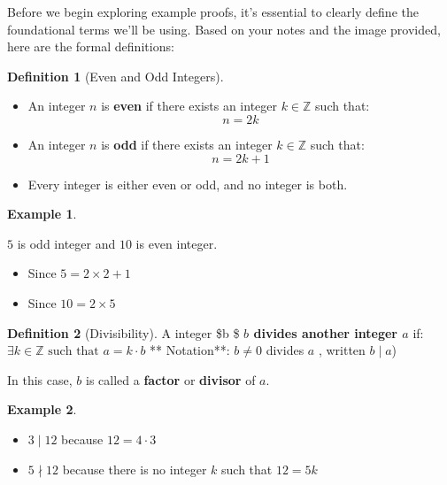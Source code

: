 \documentclass[
]{book}
\providecommand{\tightlist}{%
  \setlength{\itemsep}{0pt}\setlength{\parskip}{0pt}}
\theoremstyle{definition}
\newtheorem{definition}{Definition}[chapter]
\theoremstyle{definition}
\newtheorem{example}{Example}[chapter]
\theoremstyle{definition}
\theoremstyle{definition}
\theoremstyle{remark}
\begin{document}
Before we begin exploring example proofs, it's essential to clearly define the foundational terms we'll be using. Based on your notes and the image provided, here are the formal definitions:

\begin{definition}[Even and Odd Integers]
\protect\hypertarget{def:unnamed-chunk-63}{}\label{def:unnamed-chunk-63}\leavevmode

\begin{itemize}
\tightlist
\item
  An integer \(n\) is \textbf{even} if there exists an integer \(k \in \mathbb{Z}\) such that:
  \[
  n = 2k
  \]
\item
  An integer \(n\) is \textbf{odd} if there exists an integer \(k \in \mathbb{Z}\) such that:
  \[
  n = 2k + 1
  \]
\item
  Every integer is either even or odd, and no integer is both.
\end{itemize}

\end{definition}

\begin{example}
\protect\hypertarget{exm:unnamed-chunk-64}{}\label{exm:unnamed-chunk-64}

\(5\) is odd integer and \(10\) is even integer.

\begin{itemize}
\tightlist
\item
  Since \(5=2\times 2 +1\)
\item
  Since \(10=2\times 5\)
\end{itemize}

\end{example}

\begin{definition}[Divisibility]
\protect\hypertarget{def:unnamed-chunk-65}{}\label{def:unnamed-chunk-65}A integer \$b  \$ \textbf{\(b\) divides another integer \(a\)} if:
\(\exists k \in \mathbb{Z} \text{ such that } a = k \cdot b\)
** Notation**: \(b\neq 0\) divides \(a\) , written \(b \mid a\))

In this case, \(b\) is called a \textbf{factor} or \textbf{divisor} of \(a\).
\end{definition}

\begin{example}
\protect\hypertarget{exm:unnamed-chunk-66}{}\label{exm:unnamed-chunk-66}\leavevmode

\begin{itemize}
\tightlist
\item
  \(3 \mid 12\) because \(12 = 4 \cdot 3\)
\item
  \(5 \nmid 12\) because there is no integer \(k\) such that \(12 = 5k\)
\end{itemize}

\end{example}
\end{document}
